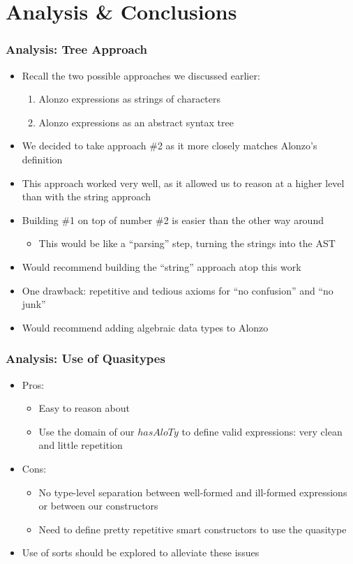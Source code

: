 \documentclass[xcolor={dvipsnames}]{beamer}
\begin{document}
\section{Analysis \& Conclusions}

\begin{frame}
\frametitle{Analysis: Tree Approach}
\begin{itemize}

\item Recall the two possible approaches we discussed earlier:
    \begin{enumerate}
        \item Alonzo expressions as strings of characters
        \item Alonzo expressions as an abstract syntax tree
    \end{enumerate}
\item<only@1> We decided to take approach \#2 as it more closely matches Alonzo's definition
\item<only@1> This approach worked very well, as it allowed us to reason at a higher level than with the string approach
\item<only@1> Building \#1 on top of number \#2 is easier than the other way around
    \begin{itemize}
    \item This would be like a ``parsing'' step, turning the strings into the AST
    \end{itemize}
\item<only@1> Would recommend building the ``string'' approach atop this work
\item<only@2> One drawback: repetitive and tedious axioms for ``no confusion'' and ``no junk''
\item<only@2> Would recommend adding algebraic data types to Alonzo
\end{itemize}
\end{frame}

\begin{frame}
\frametitle{Analysis: Use of Quasitypes}
\begin{itemize}

\item Pros:  
\begin{itemize}
    \item Easy to reason about
    \item Use the domain of our $hasAloTy$ to define valid expressions: very clean and little repetition
\end{itemize} 
\item Cons:  
\begin{itemize}
    \item No type-level separation between well-formed and ill-formed expressions or between our constructors
    \item Need to define pretty repetitive smart constructors to use the quasitype
\end{itemize} 
\item Use of sorts should be explored to alleviate these issues
\end{itemize}
\end{frame}
\end{document}
